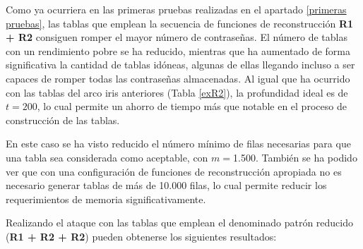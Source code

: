 \documentclass[12pt,spanish,listoffigures,listoftables]{tfgetsinf}
\begin{document}
Como ya ocurriera en las primeras pruebas realizadas en el apartado \ref{primeras pruebas}, las tablas que emplean la secuencia de funciones de reconstrucción \textbf{R1 + R2} consiguen romper el mayor número de contraseñas. El número de tablas con un rendimiento pobre se ha reducido, mientras que ha aumentado de forma significativa la cantidad de tablas idóneas, algunas de ellas llegando incluso a ser capaces de romper todas las contraseñas almacenadas. Al igual que ha ocurrido con las tablas del arco iris anteriores (Tabla \ref{exR2}), la profundidad ideal es de $t = 200$, lo cual permite un ahorro de tiempo más que notable en el proceso de construcción de las tablas.

En este caso se ha visto reducido el número mínimo de filas necesarias para que una tabla sea considerada como aceptable, con $m = $1.500. También se ha podido ver que con una configuración de funciones de reconstrucción apropiada no es necesario generar tablas de más de 10.000 filas, lo cual permite reducir los requerimientos de memoria significativamente.

Realizando el ataque con las tablas que emplean el denominado patrón reducido (\textbf{R1 + R2 + R2}) pueden obtenerse los siguientes resultados:
\end{document}
